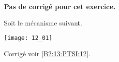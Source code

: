 \normaltrue \difficilefalse \tdifficilefalse
\correctionfalse


\setcounter{numques}{0}
\ifcorrection
\else
\textbf{Pas de corrigé pour cet exercice.}
\fi

\ifprof
\else
Soit le mécanisme suivant. 

\begin{center}
\texttt{[image: 12\_01]}
\end{center}
\fi


\ifprof

\else
\fi


\ifprof
\else
\begin{flushright}
\footnotesize{Corrigé  voir \ref{B2:13:PTSI:12}.}
\end{flushright}%
\fi